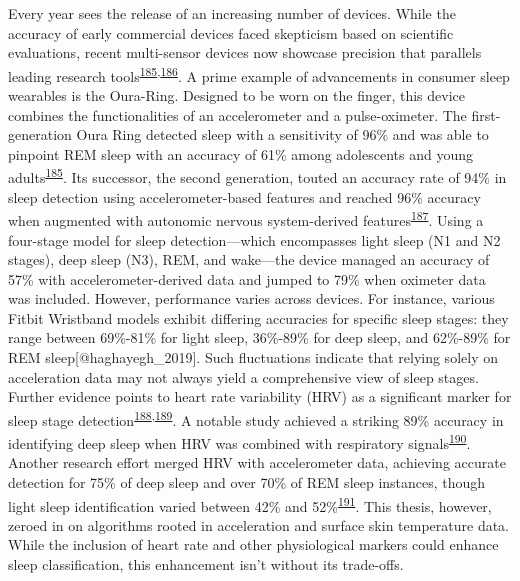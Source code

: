 \documentclass[
  10pt,
]{scrbook}
\begin{document}
Every year sees the release of an increasing number of devices. While
the accuracy of early commercial devices faced skepticism based on
scientific evaluations, recent multi-sensor devices now showcase
precision that parallels leading research
tools\textsuperscript{\protect\hyperlink{ref-dezambotti_2019}{185},\protect\hyperlink{ref-rentz_2021}{186}}.
A prime example of advancements in consumer sleep wearables is the
Oura-Ring. Designed to be worn on the finger, this device combines the
functionalities of an accelerometer and a pulse-oximeter. The
first-generation Oura Ring detected sleep with a sensitivity of 96\% and
was able to pinpoint REM sleep with an accuracy of 61\% among
adolescents and young
adults\textsuperscript{\protect\hyperlink{ref-dezambotti_2019}{185}}.
Its successor, the second generation, touted an accuracy rate of 94\% in
sleep detection using accelerometer-based features and reached 96\%
accuracy when augmented with autonomic nervous system-derived
features\textsuperscript{\protect\hyperlink{ref-altini_2021}{187}}.
Using a four-stage model for sleep detection---which encompasses light
sleep (N1 and N2 stages), deep sleep (N3), REM, and wake---the device
managed an accuracy of 57\% with accelerometer-derived data and jumped
to 79\% when oximeter data was included. However, performance varies
across devices. For instance, various Fitbit Wristband models exhibit
differing accuracies for specific sleep stages: they range between
69\%-81\% for light sleep, 36\%-89\% for deep sleep, and 62\%-89\% for
REM sleep{[}@haghayegh\_2019{]}. Such fluctuations indicate that relying
solely on acceleration data may not always yield a comprehensive view of
sleep stages. Further evidence points to heart rate variability (HRV) as
a significant marker for sleep stage
detection\textsuperscript{\protect\hyperlink{ref-herzig_2018}{188},\protect\hyperlink{ref-chouchou_2014}{189}}.
A notable study achieved a striking 89\% accuracy in identifying deep
sleep when HRV was combined with respiratory
signals\textsuperscript{\protect\hyperlink{ref-long_2017}{190}}. Another
research effort merged HRV with accelerometer data, achieving accurate
detection for 75\% of deep sleep and over 70\% of REM sleep instances,
though light sleep identification varied between 42\% and
52\%\textsuperscript{\protect\hyperlink{ref-muzet_2016}{191}}. This
thesis, however, zeroed in on algorithms rooted in acceleration and
surface skin temperature data. While the inclusion of heart rate and
other physiological markers could enhance sleep classification, this
enhancement isn't without its trade-offs.
\end{document}
